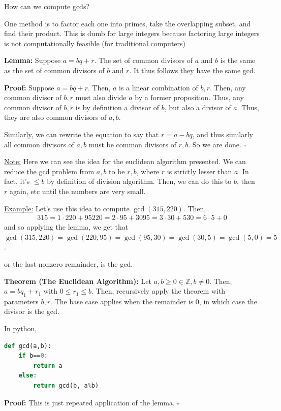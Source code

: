 \documentclass{article}
\newcommand*{\qed}{\hfill$\square$}%
\newcommand*{\zz}{\mathbb{Z}}%
\begin{document}
How can we compute gcds?

One method is to factor each one into primes, take the overlapping subset, and find their product. This is dumb for large integers because factoring large integers is not computationally feasible (for traditional computers)

\textbf{Lemma:} Suppose $a=bq+r$. The set of common divisors of $a$ and $b$ is the same as the set of common divisors of $b$ and $r$. It thus follows they have the same gcd. 

\textbf{Proof:} Suppose $a=bq+r$. Then, $a$ is a linear combination of $b,r$. Then, any common divisor of $b,r$ must also divide $a$ by a former proposition. Thus, any common divisor of $b,r$ is by definition a divisor of $b$, but also a divisor of $a$. Thus, they are also common divisors of $a,b$. 

Similarly, we can rewrite the equation to say that $r=a-bq$, and thus similarly all common divisors of $a,b$ must be common divisors of $r,b$. So we are done. \qed 

\underline{Note:} Here we can see the idea for the euclidean algorithm presented. We can reduce the gcd problem from $a,b$ to be $r,b$, where $r$ is strictly lesser than $a$. In fact, it's $\leq b$ by definition of division algorithm. Then, we can do this to $b$, then $r$ again, etc until the numbers are very small. 

\underline{Example:} Let's use this idea to compute $\gcd(315,220)$. Then, \begin{align*}
    315=1\cdot 220 + 95
    220=2\cdot 95 + 30
    95 =3\cdot 30 + 5
    30 =6\cdot 5 + 0
\end{align*}
and so applying the lemma, we get that $\gcd(315,220)=\gcd(220,95)=\gcd(95,30)=\gcd(30,5)=\gcd(5,0)=5$.

or the last nonzero remainder, is the gcd. 

\textbf{Theorem (The Euclidean Algorithm):} Let $a,b\geq 0\in \zz,b\neq 0$. Then, $a=bq_1+r_1$ with $0\leq r_1\leq b$. Then, recursively apply the theorem with parameters $b,r$. The base case applies when the remainder is 0, in which case the divisor is the gcd. 

In python, 
\begin{lstlisting}[language=Python]
def gcd(a,b):
    if b==0:
        return a
    else:
        return gcd(b, a%b)
\end{lstlisting}

\textbf{Proof:} This is just repeated application of the lemma. \qed
\end{document}
